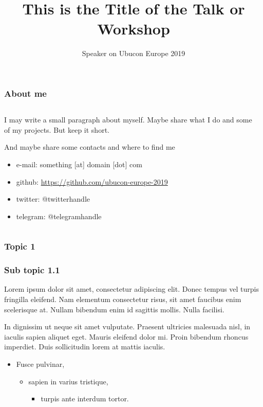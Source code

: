 \documentclass[aspectratio=169]{beamer}
\title{This is the Title of the Talk or Workshop}
\author{Speaker on Ubucon Europe 2019}
\begin{document}
\frame[plain]{\titlepage}
 
\begin{frame}
\frametitle{About me}
\begin{columns}[T]
\begin{column}{.5\textwidth}
\begin{block}{I may write a small paragraph about myself. Maybe share what I do and some of my projects. But keep it short.}

And maybe share some contacts and where to find me

\begin{itemize}
\item{} e-mail: something [at] domain [dot] com
\item{} github: \url{https://github.com/ubucon-europe-2019}
\item{} twitter: @twitterhandle
\item{} telegram: @telegramhandle
\end{itemize}
\end{block}
\end{column}
\begin{column}{.5\textwidth}
\begin{center}





\end{center}
\end{column}
\end{columns}
\end{frame}

\begin{frame}
\frametitle{Topic 1}
\end{frame}

\begin{frame}
\frametitle{Sub topic 1.1}

Lorem ipsum dolor sit amet, consectetur adipiscing elit.
Donec tempus vel turpis fringilla eleifend.
Nam elementum consectetur risus, sit amet faucibus enim scelerisque at.
Nullam bibendum enim id sagittis mollis. Nulla facilisi.

In dignissim ut neque sit amet vulputate.
Praesent ultricies malesuada nisl, in iaculis sapien aliquet eget.
Mauris eleifend dolor mi. Proin bibendum rhoncus imperdiet.
Duis sollicitudin lorem at mattis iaculis.

\begin{itemize}
	\item{} Fusce pulvinar,
	\begin{itemize}
		\item{} sapien in varius tristique,
		\begin{itemize}
        		\item{} turpis ante interdum tortor.
		\end{itemize}
	\end{itemize}
\end{itemize}

\end{frame}
\end{document}
